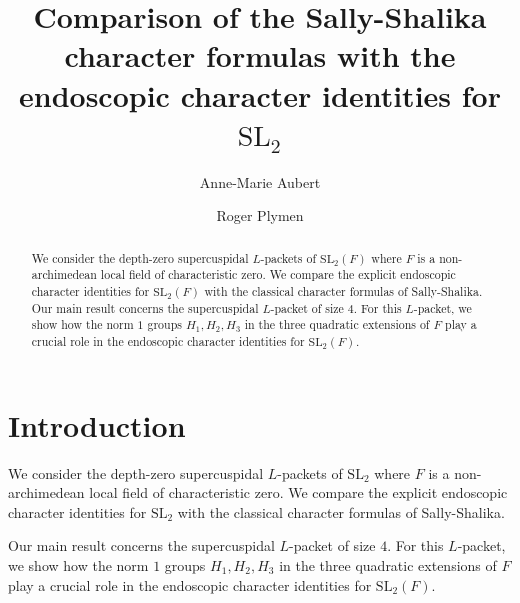\documentclass[11pt]{amsart}
\numberwithin{equation}{section}
\def\SL{\mathrm{SL}}
\newcommand{\<}{\left\langle}
\renewcommand{\>}{\right\rangle}
\begin{document}
\title[Endoscopy]{Comparison of the Sally-Shalika character formulas with the endoscopic character identities for  $\SL_2$} 




\author[A.-M. Aubert]{Anne-Marie Aubert}
\address{Sorbonne Universit\'e and Universit\'e Paris Cit\'e, CNRS, IMJ-PRG, 
F-75005 Paris, France}
\author[R. Plymen]{Roger Plymen}
\address
{School of Mathematics, Southampton University, Southampton SO17 1BJ,  England 
\emph{and} School of Mathematics, Alan Turing Building, Manchester University, Manchester M13 9PL, England}


\keywords{Endoscopy, characters, $p$-adic, $\SL_2$}
\maketitle


\begin{abstract}  We consider the depth-zero supercuspidal $L$-packets of  $\SL_2(F)$ where $F$ is a non-archimedean local field of characteristic zero.   
We compare the explicit endoscopic character identities for $\SL_2(F)$ with  the classical character formulas of Sally-Shalika.   Our main result concerns the 
supercuspidal $L$-packet of size $4$.   For this $L$-packet, we show how the norm $1$ groups $H_1, H_2, H_3$ in the three quadratic extensions of $F$ play a crucial role in the 
endoscopic character identities for $\SL_2(F)$.
 

  
\end{abstract}

\tableofcontents

\section{Introduction}  We consider the depth-zero supercuspidal $L$-packets of  $\SL_2$ where $F$ is a non-archimedean local field of characteristic zero.  We compare the explicit endoscopic character identities for $\SL_2$ with  the classical character formulas of Sally-Shalika.

Our main result concerns the supercuspidal $L$-packet of size $4$.  
 For this $L$-packet, we show how the norm $1$ groups $H_1, H_2, H_3$ in the three quadratic extensions of $F$ play a crucial role in the 
endoscopic character identities for $\SL_2(F)$.
\end{document}
